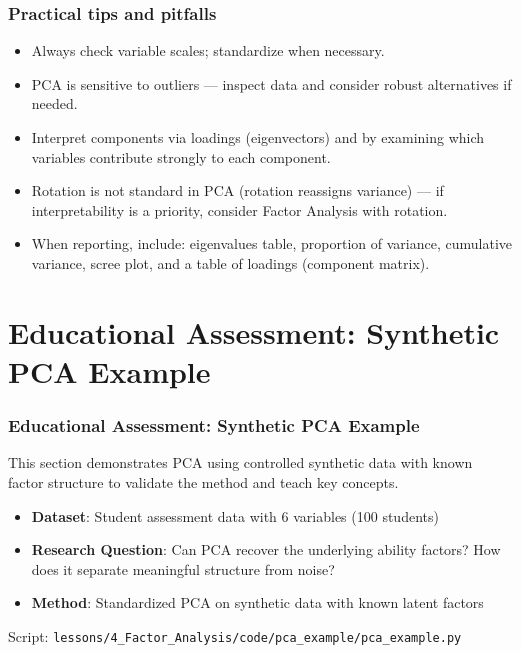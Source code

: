 \documentclass[aspectratio=169]{beamer}
\begin{document}
\begin{frame}
    \frametitle{Practical tips and pitfalls}
    \begin{itemize}
        \item Always check variable scales; standardize when necessary. \pause
        \item PCA is sensitive to outliers — inspect data and consider robust alternatives if needed. \pause
        \item Interpret components via loadings (eigenvectors) and by examining which variables contribute strongly to each component. \pause
        \item Rotation is not standard in PCA (rotation reassigns variance) — if interpretability is a priority, consider Factor Analysis with rotation. \pause
        \item When reporting, include: eigenvalues table, proportion of variance, cumulative variance, scree plot, and a table of loadings (component matrix). \pause
    \end{itemize}
\end{frame}

\section{Educational Assessment: Synthetic PCA Example}

\begin{frame}
    \frametitle{Educational Assessment: Synthetic PCA Example}
    This section demonstrates PCA using controlled synthetic data with known factor structure to validate the method and teach key concepts.
    \begin{itemize}
        \item \textbf{Dataset}: Student assessment data with 6 variables (100 students) \pause
        \item \textbf{Research Question}: Can PCA recover the underlying ability factors? How does it separate meaningful structure from noise? \pause
        \item \textbf{Method}: Standardized PCA on synthetic data with known latent factors \pause
    \end{itemize}
    \vspace{6pt}
    Script: \texttt{lessons/4\_Factor\_Analysis/code/pca\_example/pca\_example.py}
\end{frame}
\end{document}
